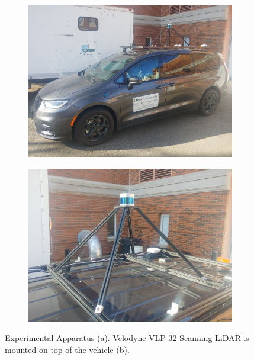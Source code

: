 \documentclass[journal,onecolumn]{IEEEtran}
\begin{document}
	\begin{figure}[H] 
		\centering
		\begin{subfigure}{0.45\textwidth}
			\centering
			\includegraphics[width=0.9\linewidth,height=4.60 cm,keepaspectratio]{figures/van_on_van}
			\caption[Sensor Van]{}
			\label{fig:van}
		\end{subfigure}
		\begin{subfigure}{0.45\textwidth}
			\centering
			\includegraphics[width=0.9\linewidth,height=4.60 cm,keepaspectratio]{figures/LiDAR_on_van}
			\caption[VLP 32 on Van]{}
			\label{fig:vlp32mount}
		\end{subfigure}
		\caption[Experimental Apparatus]{Experimental Apparatus (a). Velodyne VLP-32 Scanning LiDAR is mounted on top of the vehicle (b).}
		\label{fig:Experimental_Apperatus}
	\end{figure}
\end{document}
